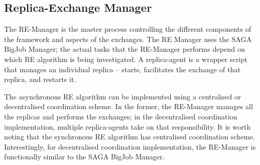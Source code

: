 \documentclass{rspublic}
\newcommand{\jhanote}[1]{ {\textcolor{red} { ***shantenu: #1 }}}
\newcommand{\athotanote}[1]{ {\textcolor{green} { ***athota: #1 }}}
\newcommand{\athotanote}[1]{}
\newcommand{\jhanote}[1]{}
\begin{document}
\subsection{Replica-Exchange Manager}\label{repexmanager} 

  
  
The RE-Manager is the master process controlling the different
components of the framework and aspects of the exchanges.  The RE
Manager %
uses the SAGA BigJob Manager; the actual tasks that the RE-Manager
performs depend on which RE algorithm is being investigated.  A
replica-agent is a wrapper script that manages an individual replica
-- starts, facilitates the exchange of that replica, and restarts it.


The asynchronous RE algorithm can be implemented using a centralised
or decentralised coordination scheme.  In the former, the RE-Manager
manages all the replicas and performs the exchanges; in the
decentralised coordination implementation, multiple replica-agents
take on that responsibility.  It is worth noting that the synchronous
RE algorithm has centralised coordination scheme.  Interestingly, for
decentralised coordination implementation, the RE-Manager is
functionally similar to the SAGA BigJob Manager.

\end{document}
